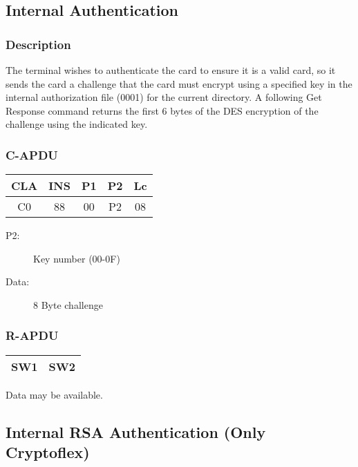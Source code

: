 \documentclass[a4paper,oneside]{article}
\begin{document}

\subsection{Internal Authentication}

\subsubsection*{Description}

The terminal wishes to authenticate the card to ensure it is a
valid card, so it sends the card a challenge that the card must
encrypt using a specified key in the internal authorization
file (0001) for the current directory. A following Get Response
command returns the first 6 bytes of the DES encryption of
the challenge using the indicated key.

\subsubsection*{C-APDU}

\begin{tabular}{|c|c|c|c|c|} \hline
CLA & INS & P1 & P2 & Lc \\ \hline \hline
C0 & 88 & 00 & P2 & 08 \\ \hline
\end{tabular}

\begin{description}
\item[P2:] Key number (00-0F)
\item[Data:] 8 Byte challenge
\end{description}

\subsubsection*{R-APDU}

\begin{tabular}{|c|c|} \hline
SW1 & SW2 \\ \hline
\end{tabular}

Data may be available.


\subsection{Internal RSA Authentication (Only Cryptoflex)}
\end{document}
